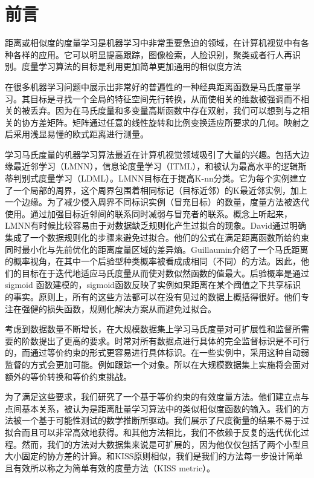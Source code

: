 \section{前言}
距离或相似度的度量学习是机器学习中非常重要急迫的领域，在计算机视觉中有各种各样的应用。它可以明显提高跟踪，图像检索，人脸识别，聚类或者行人再识别。度量学习算法的目标是利用更加简单更加通用的相似度方法

在很多机器学习问题中展示出非常好的普遍性的一种经典距离函数是马氏度量学习。其目标是寻找一个全局的特征空间先行转换，从而使相关的维数被强调而不相关的被丢弃。因为在马氏度量和多变量高斯函数中存在双射，我们可以想到与之相关的协方差矩阵。矩阵通过任意的线性旋转和比例变换适应所要求的几何。映射之后采用浅显易懂的欧式距离进行测量。

学习马氏度量的机器学习算法最近在计算机视觉领域吸引了大量的兴趣。包括大边缘最近邻学习（LMNN），信息论度量学习（ITML），和被认为最高水平的逻辑斯蒂判别式度量学习（LDML）。LMNN目标在于提高K-nn分类。它为每个实例建立了一个局部的周界，这个周界包围着相同标记（目标近邻）的K最近邻实例，加上一个边缘。为了减少侵入周界不同标识实例（冒充目标）的数量，度量方法被迭代使用。通过加强目标近邻间的联系同时减弱与冒充者的联系。概念上听起来，LMNN有时候比较容易由于对数据缺乏规则化产生过拟合的现象。David通过明确集成了一个数据规则化的步骤来避免过拟合。他们的公式在满足距离函数所给约束同时最小化与先前优化的距离度量区域的差异熵。Guillaumin介绍了一个马氏距离的概率视角，在其中一个后验型种类概率被看成成相同（不同）的方法。因此，他们的目标在于迭代地适应马氏度量从而使对数似然函数的值最大。后验概率是通过sigmoid 函数建模的，sigmoid函数反映了实例如果距离在某个阈值之下共享标识的事实。原则上，所有的这些方法都可以在没有见过的数据上概括得很好。他们专注在强健的损失函数，规则化解决方案从而避免过拟合。

考虑到数据数量不断增长，在大规模数据集上学习马氏度量对可扩展性和监督所需要的阶数提出了更高的要求。时常对所有数据点进行具体的完全监督标识是不可行的，而通过等价约束的形式更容易进行具体标识。在一些实例中，采用这种自动弱监督的方式会更加可能。例如跟踪一个对象。所以在大规模数据集上实施将会面对额外的等价转换和等价约束挑战。

为了满足这些要求，我们研究了一个基于等价约束的有效度量方法。他们建立点与点间基本关系，被认为是距离肚量学习算法中的类似相似度函数的输入。我们的方法被一个基于可能性测试的数学推断所驱动。我们展示了尺度衡量的结果不易于过拟合而且可以非常高效地获得。和其他方法相比，我们不依赖于反复的迭代优化过程。然而，我们的方法对大数据集来说是可扩展的，因为他仅仅包括了两个小型且大小固定的协方差的计算。和KISS原则相似，我们是我们的方法每一步设计简单且有效所以称之为简单有效的度量方法（KISS metric）。

